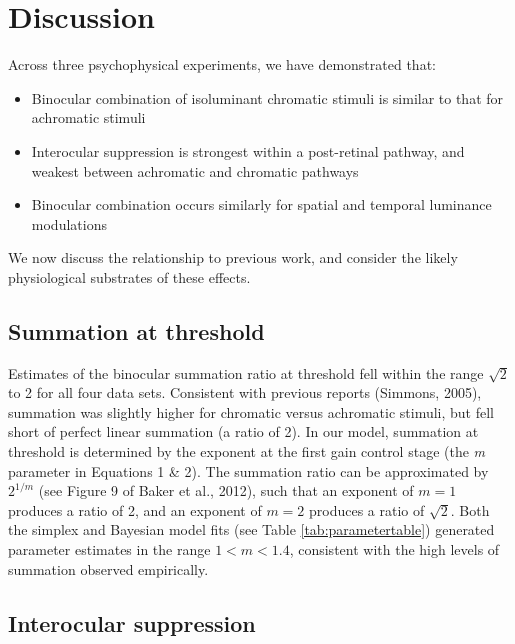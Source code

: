 \documentclass[
]{article}
\providecommand{\tightlist}{%
  \setlength{\itemsep}{0pt}\setlength{\parskip}{0pt}}
\begin{document}
\hypertarget{discussion}{%
\section{Discussion}\label{discussion}}

Across three psychophysical experiments, we have demonstrated that:

\begin{itemize}
\tightlist
\item
  Binocular combination of isoluminant chromatic stimuli is similar to that for achromatic stimuli
\item
  Interocular suppression is strongest within a post-retinal pathway, and weakest between achromatic and chromatic pathways
\item
  Binocular combination occurs similarly for spatial and temporal luminance modulations
\end{itemize}

We now discuss the relationship to previous work, and consider the likely physiological substrates of these effects.

\hypertarget{summation-at-threshold}{%
\subsection{Summation at threshold}\label{summation-at-threshold}}

Estimates of the binocular summation ratio at threshold fell within the range \(\sqrt{2}\) to 2 for all four data sets. Consistent with previous reports (Simmons, 2005), summation was slightly higher for chromatic versus achromatic stimuli, but fell short of perfect linear summation (a ratio of 2). In our model, summation at threshold is determined by the exponent at the first gain control stage (the \emph{m} parameter in Equations 1 \& 2). The summation ratio can be approximated by \(2^{1/m}\) (see Figure 9 of Baker et al., 2012), such that an exponent of \(m=1\) produces a ratio of 2, and an exponent of \(m = 2\) produces a ratio of \(\sqrt{2}\). Both the simplex and Bayesian model fits (see Table \ref{tab:parametertable}) generated parameter estimates in the range \(1 < m < 1.4\), consistent with the high levels of summation observed empirically.

\hypertarget{interocular-suppression}{%
\subsection{Interocular suppression}\label{interocular-suppression}}
\end{document}
